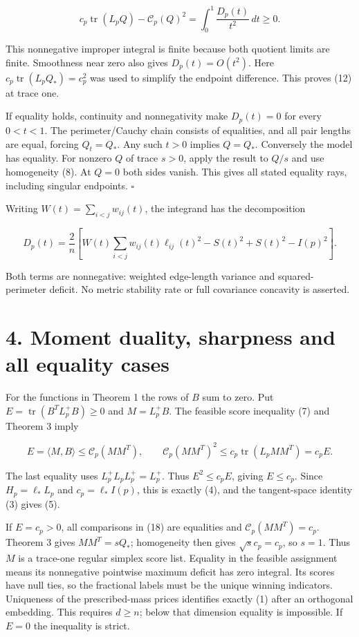 \documentclass[
  11pt,
]{article}
\begin{document}
\[
 c_p\operatorname{tr}(L_pQ)-\mathcal C_p(Q)^2
                         =\int_0^1\frac{D_p(t)}{t^2}\,dt\ge0.
                                                               \tag{16}
\]

This nonnegative improper integral is finite because both quotient
limits are finite. Smoothness near zero also gives \(D_p(t)=O(t^2)\).
Here \(c_p\operatorname{tr}(L_pQ_*)=c_p^2\) was used to simplify the
endpoint difference. This proves (12) at trace one.

If equality holds, continuity and nonnegativity make \(D_p(t)=0\) for
every \(0<t<1\). The perimeter/Cauchy chain consists of equalities, and
all pair lengths are equal, forcing \(Q_t=Q_*\). Any such \(t>0\)
implies \(Q=Q_*\). Conversely the model has equality. For nonzero \(Q\)
of trace \(s>0\), apply the result to \(Q/s\) and use homogeneity (8).
At \(Q=0\) both sides vanish. This gives all stated equality rays,
including singular endpoints. \(\square\)

Writing \(W(t)=\sum_{i<j}w_{ij}(t)\), the integrand has the
decomposition

\[
 D_p(t)=\frac2n\left[
  W(t)\sum_{i<j}w_{ij}(t)\ell_{ij}(t)^2-S(t)^2
                                    +S(t)^2-I(p)^2\right].       \tag{17}
\]

Both terms are nonnegative: weighted edge-length variance and
squared-perimeter deficit. No metric stability rate or full covariance
concavity is asserted.

\section{4. Moment duality, sharpness and all equality
cases}\label{moment-duality-sharpness-and-all-equality-cases}

For the functions in Theorem 1 the rows of \(B\) sum to zero. Put
\(E=\operatorname{tr}(B^TL_p^+B)\ge0\) and \(M=L_p^+B\). The feasible
score inequality (7) and Theorem 3 imply

\[
 E=\langle M,B\rangle\le\mathcal C_p(MM^T),\qquad
 \mathcal C_p(MM^T)^2\le c_p\operatorname{tr}(L_pMM^T)=c_pE.       \tag{18}
\]

The last equality uses \(L_p^+L_pL_p^+=L_p^+\). Thus \(E^2\le c_pE\),
giving \(E\le c_p\). Since \(H_p=\ell_*L_p\) and \(c_p=\ell_*I(p)\),
this is exactly (4), and the tangent-space identity (3) gives (5).

If \(E=c_p>0\), all comparisons in (18) are equalities and
\(\mathcal C_p(MM^T)=c_p\). Theorem 3 gives \(MM^T=sQ_*\); homogeneity
then gives \(\sqrt{s}c_p=c_p\), so \(s=1\). Thus \(M\) is a trace-one
regular simplex score list. Equality in the feasible assignment means
its nonnegative pointwise maximum deficit has zero integral. Its scores
have null ties, so the fractional labels must be the unique winning
indicators. Uniqueness of the prescribed-mass prices identifies exactly
(1) after an orthogonal embedding. This requires \(d\ge n\); below that
dimension equality is impossible. If \(E=0\) the inequality is strict.
\end{document}
